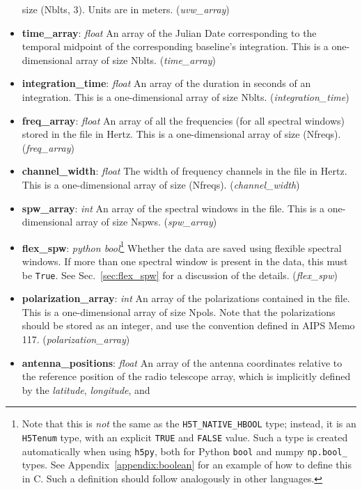 \documentclass[11pt, oneside]{article}
\begin{document}
\begin{itemize}
  size (Nblts, 3). Units are in meters. (\textit{uvw\_array})
\item \textbf{time\_array}: \textit{float} An array of the Julian Date
  corresponding to the temporal midpoint of the corresponding baseline's
  integration. This is a one-dimensional array of size
  Nblts. (\textit{time\_array})
\item \textbf{integration\_time}: \textit{float} An array of the duration in
  seconds of an integration. This is a one-dimensional array of size
  Nblts. (\textit{integration\_time})
\item \textbf{freq\_array}: \textit{float} An array of all the frequencies (for
  all spectral windows) stored in the file in Hertz. This is a one-dimensional
  array of size (Nfreqs). (\textit{freq\_array})
\item \textbf{channel\_width}: \textit{float} The width of frequency channels in
  the file in Hertz. This is a one-dimensional array of size
  (Nfreqs). (\textit{channel\_width})
\item \textbf{spw\_array}: \textit{int} An array of the spectral windows in the
  file. This is a one-dimensional array of size Nspws. (\textit{spw\_array})
\item \textbf{flex\_spw}: \textit{python bool}\footnote{Note that this is
    \textit{not} the same as the \texttt{H5T\_NATIVE\_HBOOL} type; instead, it
    is an \texttt{H5Tenum} type, with an explicit \texttt{TRUE} and
    \texttt{FALSE} value. Such a type is created automatically when using
    \texttt{h5py}, both for Python \texttt{bool} and numpy \texttt{np.bool\_}
    types. See Appendix~\ref{appendix:boolean} for an example of how to define
    this in C. Such a definition should follow analogously in other languages.}
  Whether the data are saved using flexible spectral windows. If more than one
  spectral window is present in the data, this must be \texttt{True}. See
  Sec.~\ref{sec:flex_spw} for a discussion of the details. (\textit{flex\_spw})
\item \textbf{polarization\_array}: \textit{int} An array of the polarizations
  contained in the file. This is a one-dimensional array of size Npols. Note
  that the polarizations should be stored as an integer, and use the convention
  defined in AIPS Memo 117. (\textit{polarization\_array})
\item \textbf{antenna\_positions}: \textit{float} An array of the antenna
  coordinates relative to the reference position of the radio telescope array,
  which is implicitly defined by the \textit{latitude}, \textit{longitude}, and

\end{itemize}
\end{document}
